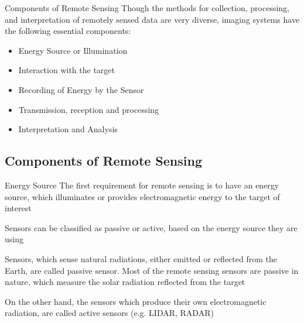 \documentclass[10pt]{beamer}
\begin{document}
\begin{frame}{Components of Remote Sensing}
  Though the methods for collection, processing, and interpretation of remotely sensed data are very diverse, 
  imaging systems have the following essential components:

  \begin{itemize}
    \item Energy Source or Illumination
    \item Interaction with the target
    \item Recording of Energy by the Sensor
    \item Transmission, reception and processing
    \item Interpretation and Analysis
  \end{itemize}
\end{frame}

\subsection{Components of Remote Sensing}
\begin{frame}{Energy Source}
  The first requirement for remote sensing is to have an energy source, which illuminates or provides
  electromagnetic energy to the target of interest

  Sensors can be classified as passive or active, based on the energy source they are using

  Sensors, which sense natural radiations, either emitted or reflected from the Earth, are called passive sensor. Most of the remote sensing sensors are passive in nature, which measure the solar radiation reflected from the target

  On the other hand, the sensors which produce their own electromagnetic radiation, are called active sensors (e.g. LIDAR, RADAR)
\end{frame}
\end{document}
